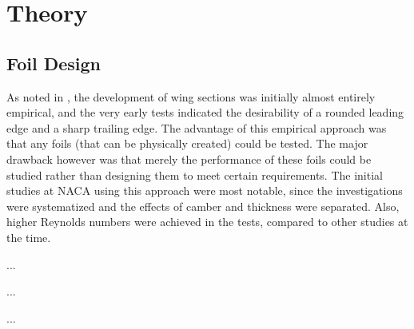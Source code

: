 \chapter{Theory}

\section{Foil Design}\label{sec:Foil Design}

As noted in \cite{Abbott1959}, the development of wing sections was initially
almost entirely empirical, and the very early tests indicated the desirability
of a rounded leading edge and a sharp trailing edge. The advantage of this
empirical approach was that any foils (that can be physically created) could be
tested. The major drawback however was that merely the performance of these
foils could be studied rather than designing them to meet certain requirements.
The initial studies at NACA using this approach were most notable, since the
investigations were systematized and the effects of camber and thickness were
separated. Also, higher Reynolds numbers were achieved in the tests, compared to
other studies at the time.

...

...

...
